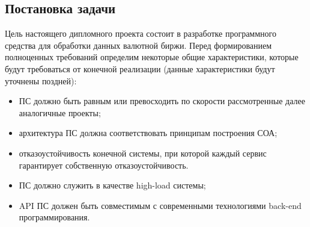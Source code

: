 \subsection{Постановка задачи}\label{sec:analysis:task}

Цель настоящего дипломного проекта состоит в разработке программного средства для обработки данных валютной биржи. Перед формированием полноценных требований определим некоторые общие характеристики, которые будут требоваться от конечной реализации (данные характеристики будут уточнены поздней):
\begin{itemize}
    \item ПС должно быть равным или превосходить по скорости рассмотренные далее аналогичные проекты;
    \item архитектура ПС должна соответствовать принципам построения СОА;
    \item отказоустойчивость конечной системы, при которой каждый сервис гарантирует собственную отказоустойчивость.
    \item ПС должно служить в качестве high-load системы;
    \item API ПС должен быть совместимым с современными технологиями back-end программирования.
\end{itemize}
